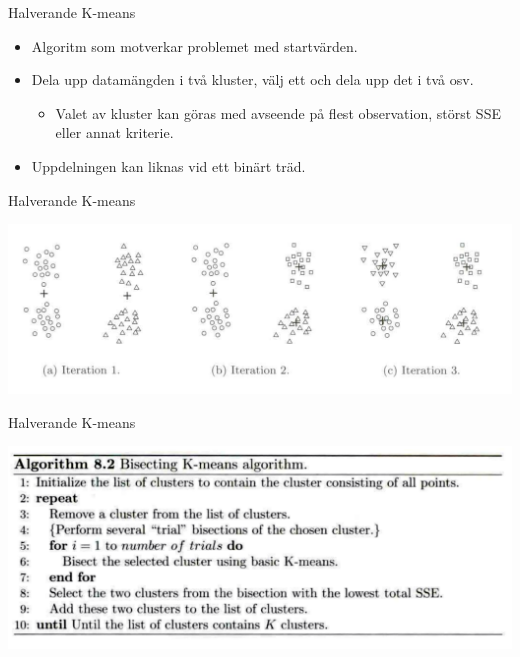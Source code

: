 \documentclass[10pt,english]{beamer}
\begin{document}
\begin{frame}{Halverande K-means}

    \begin{itemize}
        \item Algoritm som motverkar problemet med startvärden.
        \item Dela upp datamängden i två kluster, välj ett och dela upp det i två osv.
        \begin{itemize}
            \item Valet av kluster kan göras med avseende på flest observation, störst SSE eller annat kriterie.
        \end{itemize}
        \item Uppdelningen kan liknas vid ett binärt träd.
    \end{itemize}
    
\end{frame}

\begin{frame}{Halverande K-means}

    \includegraphics[width=\textwidth]{figs/Halverande K-means_exempel.png}
    
\end{frame}

\begin{frame}{Halverande K-means}

    \includegraphics[width = \textwidth]{figs/Halverande K-means algoritm.png}
    
\end{frame}
\end{document}
